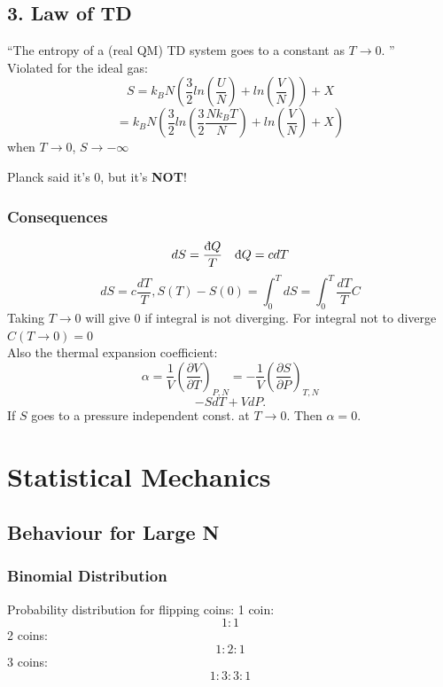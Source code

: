 \documentclass[11pt]{book}
\theoremstyle{definition}
\begin{document}
\section{3. Law of TD}
``The entropy of a (real QM) TD system goes to a constant as $ T \to 0 $. ''\\
Violated for the ideal gas:
\[ S = k_BN (\frac{3}{2}ln\left( \frac{U}{N} \right) + ln\left( \frac{V}{N} \right) ) + X \] 
\[ = k_B N\left(\frac{3}{2} ln \left(\frac{3}{2} \frac{Nk_BT}{N} \right) + ln\left( \frac{V}{N} \right) +X \right) \] 
when $ T \to 0 $, $ S \to -\infty $  

Planck said it's $ 0 $, but it's \textbf{NOT}! 
\subsection{Consequences}
\[ dS = \frac{ \text{\dj}Q }{T} \quad \text{\dj}Q = cdT\]
\[ dS = c \frac{dT}{T}, S(T)-S(0) = \int_0^{T}dS = \int_0^{T} \frac{dT}{T} C \] 
Taking $ T \to 0 $ will give $ 0 $ if integral is not diverging. For integral not to diverge $ C(T \to 0) = 0 $ \\
Also the thermal expansion coefficient:
\[ \alpha = \frac{1}{V}\left( \frac{\partial V}{\partial T} \right)_{P,N} = -\frac{1}{V} \left( \frac{\partial S}{\partial P} \right)_{T,N} \] 
\[ -SdT + V dP. \] 
If $ S $ goes to a pressure independent const. at $ T \to 0 $. Then $ \alpha=0 $.


\newpage
\chapter{Statistical Mechanics}
\section{Behaviour for Large N}
\subsection{Binomial Distribution}
Probability distribution for flipping coins:
1 coin: \[ 1:1 \] 
2 coins: \[ 1:2:1 \] 
3 coins: \[ 1:3:3:1 \] 
\end{document}
